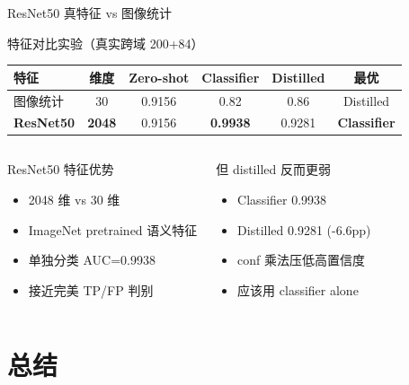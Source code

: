 \documentclass[aspectratio=169, 10pt]{beamer}
\begin{document}
\begin{frame}{ResNet50 真特征 vs 图像统计}
  \begin{block}{特征对比实验（真实跨域 200+84）}
    \centering
    \begin{tabular}{lccccc}
      \toprule
      \textbf{特征} & \textbf{维度} & \textbf{Zero-shot} & \textbf{Classifier} & \textbf{Distilled} & \textbf{最优} \\
      \midrule
      图像统计 & 30 & 0.9156 & 0.82 & 0.86 & Distilled \\
      \textbf{ResNet50} & \textbf{2048} & 0.9156 & \textcolor{mygreen}{\textbf{0.9938}} & 0.9281 & \textbf{Classifier} \\
      \bottomrule
    \end{tabular}
  \end{block}
  \vspace{-0.3em}
  \begin{columns}[T]
    \begin{block}{ResNet50 特征优势}
      \begin{itemize}
        \item 2048 维 vs 30 维
        \item ImageNet pretrained 语义特征
        \item 单独分类 AUC=0.9938
        \item 接近完美 TP/FP 判别
      \end{itemize}
    \end{block}
    \begin{block}{但 distilled 反而更弱}
      \begin{itemize}
        \item Classifier 0.9938
        \item Distilled 0.9281 (-6.6pp)
        \item conf 乘法压低高置信度
        \item 应该用 classifier alone
      \end{itemize}
    \end{block}
  \end{columns}
\end{frame}

\section{总结}
\end{document}
